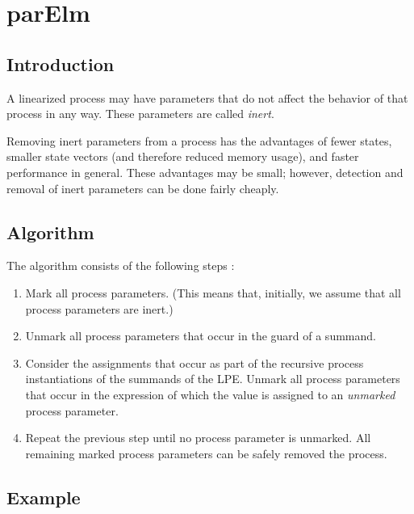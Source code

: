 \chapter{parElm}

\section{Introduction}

A linearized process may have parameters that do not affect the behavior of that process in any way.
These parameters are called \emph{inert}.

Removing inert parameters from a process has the advantages of fewer states, smaller state vectors (and therefore reduced memory usage), and faster performance in general.
These advantages may be small; however, detection and removal of inert parameters can be done fairly cheaply.

\section{Algorithm}

The algorithm consists of the following steps \cite{groote2001computer}:

\begin{enumerate}

\item Mark all process parameters.
(This means that, initially, we assume that all process parameters are inert.)

\item Unmark all process parameters that occur in the guard of a summand.

\item Consider the assignments that occur as part of the recursive process instantiations of the summands of the LPE.
Unmark all process parameters that occur in the expression of which the value is assigned to an \emph{unmarked} process parameter.

\item Repeat the previous step until no process parameter is unmarked.
All remaining marked process parameters can be safely removed the process.

\end{enumerate}

\clearpage
\section{Example}

